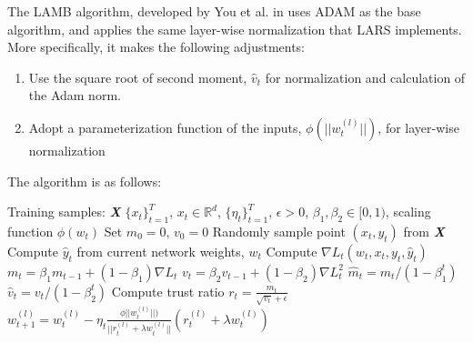 The LAMB algorithm, developed by You et al. in \cite{You2020Large} uses ADAM as the base algorithm, and applies the same layer-wise normalization that LARS implements. More specifically, it makes the following adjustments:
\begin{enumerate}
    \item Use the square root of second moment, $\hat v_t$ for normalization and calculation of the Adam norm.
    \item Adopt a parameterization function of the inputs, $\phi(||w_t^{(l)}||)$, for layer-wise normalization
\end{enumerate}

The algorithm is as follows:
\begin{minipage}[b]{.5\textwidth}
\begin{algorithm}[H]\small
	\caption{$LAMB$ \cite{You2020Large}}
	\label{alg:lamb}
	\begin{algorithmic}
		  Training samples: \textbf{\textit{X}} \subset $\{x_t\}_{t=1}^T$, $x_t \in \mathbb{R}^d$, $\{\eta_t\}_{t=1}^T$, $\epsilon>0$,  $\beta_{1},\beta_{2} \in [0,1)$, scaling function $\phi(w_t)$
		\vspace{3pt}
		\STATE Set $m_{0} = 0$, $v_{0} = 0$
		\vspace{3pt}
		\STATE Randomly sample point $(x_t,y_t)$ from \textbf{\textit{X}}
		\vspace{3pt}
		\STATE Compute $\hat y_t$ from current network weights, $w_t$
		\vspace{3pt}
		\STATE Compute $\nabla L_t(w_t, x_{t}, y_t,\hat y_t)$
		\vspace{3pt}
		\STATE $m_{t} = \beta_{1}m_{t-1}+(1-\beta_{1})\nabla L_t$
        \vspace{3pt}
        \STATE $v_{t} = \beta_{2}v_{t-1}+(1-\beta_{2})\nabla L_t^2$
        \vspace{3pt}
        \STATE $\hat{m}_{t}={m_t}/(1-\beta_1^t)$
        \vspace{3pt}
        \STATE $\hat{v}_{t}={v_t}/(1-\beta_2^t)$
        \vspace{3pt}
		\STATE Compute trust ratio $r_t = \frac{m_t}{\sqrt{v_t} + \epsilon}$
		\vspace{3pt}
		\STATE $w_{t+1}^{(l)} = w_{t}^{(l)} - \eta_t \frac{\phi||w_t^{(l)}||)}{||r_t^{(l)} + \lambda w_t^{(l)}||} (r_t^{(l)} + \lambda w_t^{(l)})$
		\ENDFOR
	\end{algorithmic}
\end{algorithm}
\end{minipage}

